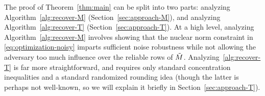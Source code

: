 The proof of Theorem~\ref{thm:main} can be split into two parts: analyzing 
Algorithm~\ref{alg:recover-M} (Section~\ref{sec:approach-M}), 
and analyzing Algorithm~\ref{alg:recover-T} (Section~\ref{sec:approach-T}). 
At a high level, analyzing Algorithm~\ref{alg:recover-M} involves showing that 
the nuclear norm constraint in \eqref{eq:optimization-noisy} imparts sufficient 
noise robustness while not allowing the adversary too much influence over the 
reliable rows of $\tilde{M}$. Analyzing~\ref{alg:recover-T} is far more straightforward, 
and requires only standard concentration inequalities and a standard randomized 
rounding idea (though the latter is perhaps not well-known, so we will explain 
it briefly in Section~\ref{sec:approach-T}).

